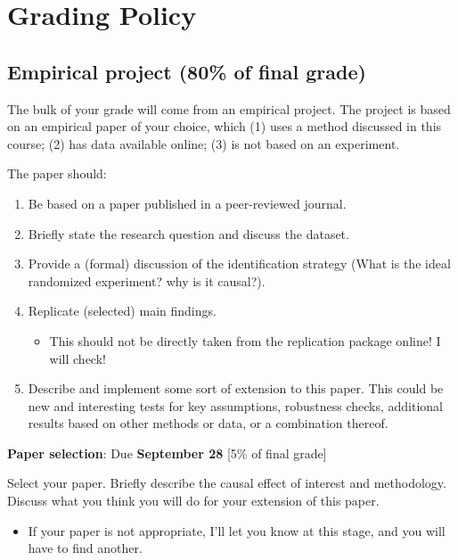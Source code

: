 \documentclass[11 pt]{article}
\begin{document}
\section*{Grading Policy}

\subsection*{Empirical project (80\% of final grade)}

The bulk of your grade will come from an empirical project. 
The project is based on an empirical paper of your choice, which (1) uses a method discussed in this course; (2) has data available online; 
(3) is not based on an experiment. 

The paper should:
\begin{enumerate}
    \item Be based on a paper published in a peer-reviewed journal.
    \item Briefly state the research question and discuss the dataset.
    \item Provide a (formal) discussion of the identification strategy (What is the ideal randomized experiment? why is it causal?).
    \item Replicate (selected) main findings.
    \begin{itemize}
        \item This should not be directly taken from the replication package online! I will check!
    \end{itemize}
    \item Describe and implement some sort of extension to this paper. This could be new and interesting tests for key assumptions, robustness checks, additional results based on other methods or data, or a combination thereof.
\end{enumerate}

\textbf{Paper selection}: Due \textbf{September 28} [5\% of final grade]
\begin{blist}
\item Select your paper. Briefly describe the causal effect of interest and methodology. Discuss what you think you will do for your extension of this paper. 
\begin{itemize}
    \item If your paper is not appropriate, I'll let you know at this stage, and you will have to find another.
\end{itemize}
\end{blist}
\end{document}
